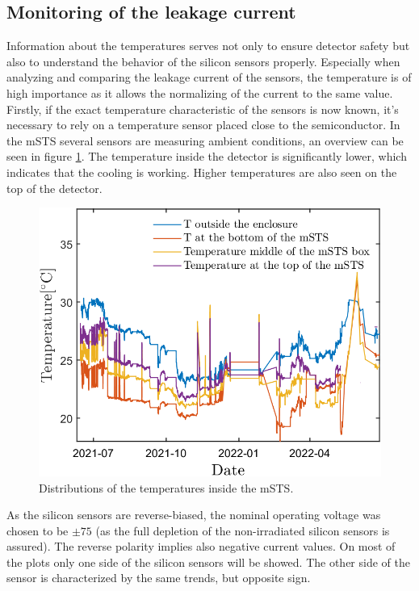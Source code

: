 \subsection{Monitoring of the leakage current}

Information about the temperatures serves not only to ensure detector safety but also to understand the behavior of the silicon sensors properly. Especially when analyzing and comparing the leakage current of the sensors, the temperature is of high importance as it allows the normalizing of the current to the same value. Firstly, if the exact temperature characteristic of the sensors is now known, it's necessary to rely on a temperature sensor placed close to the semiconductor. In the \gls{mSTS} several sensors are measuring ambient conditions, an overview can be seen in figure \ref{fig_temperatures}. The temperature inside the detector is significantly lower, which indicates that the cooling is working. Higher temperatures are also seen on the top of the detector. 

\newpage
\begin{figure}[!h]
\centering
\includegraphics[width=0.55\columnwidth]{Chapter6/DCS/images/rates/tempmSTS.png}
\caption{Distributions of the temperatures inside the \gls{mSTS}.}
\label{fig_temperatures}
\end{figure}

As the silicon sensors are reverse-biased, the nominal operating voltage was chosen to be $\pm75$ (as the full depletion of the non-irradiated silicon sensors is assured). The reverse polarity implies also negative current values. On most of the plots only one side of the silicon sensors will be showed. The other side of the sensor is characterized by the same trends, but opposite sign.

